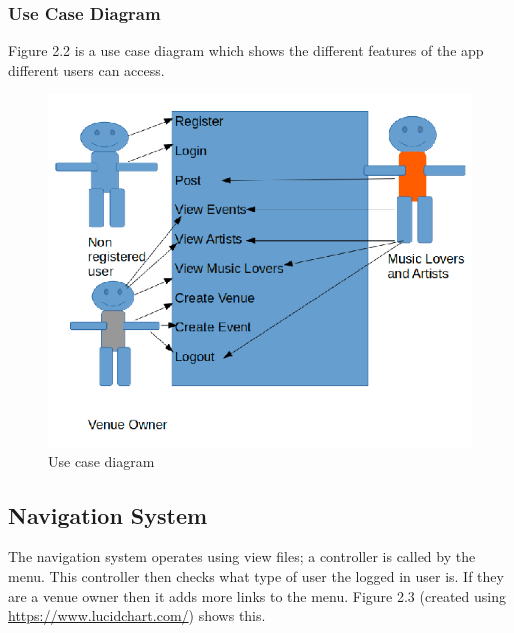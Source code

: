 \subsubsection{Use Case Diagram}
Figure 2.2 is a use case diagram which shows the different features of the app different users can access.
\begin{center} 
\begin{figure}[H]
\includegraphics[scale=0.5]{images/usecase}
\caption{Use case diagram}
\end{figure}
\end{center}

\subsection{Navigation System}
The navigation system operates using view files; a controller is called by the menu. This controller then checks what type of user the logged in user is. If they are a venue owner then it adds more links to the menu. Figure 2.3 (created using \url{https://www.lucidchart.com/}) shows this.

